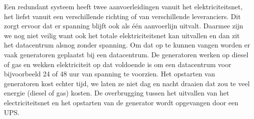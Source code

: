 Een redundant systeem heeft twee aanvoerleidingen vanuit het elektriciteitsnet, het liefst vanuit een verschillende richting of van verschillende leveranciers. Dit zorgt ervoor dat er spanning blijft ook als \'e\'en aanvoerlijn uitvalt. Daarmee zijn we nog niet veilig want ook het totale elektriciteitsnet kan uitvallen en dan zit het datacentrum alsnog zonder spanning. Om dat op te kunnen vangen worden er vaak generatoren geplaatst bij een datacentrum. De generatoren werken op diesel of gas en wekken elektriciteit op dat voldoende is om een datacentrum voor bijvoorbeeld 24 of 48 uur van spanning te voorzien. Het opstarten van generatoren kost echter tijd, we laten ze niet dag en nacht draaien dat zou te veel energie (diesel of gas) kosten. De overbrugging tussen het uitvallen van het electriciteitsnet en het opstarten van de generator wordt opgevangen door een UPS.

